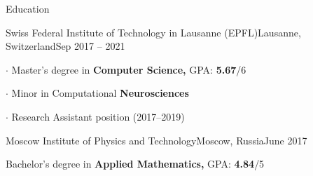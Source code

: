 \documentclass{resume} %
\begin{document}
\newcommand{\myitem}{\item[\textcolor{grayitem}{$\cdot$}]}
\begin{rSection}{Education}
\hspace{-1em}
\begin{rSubsection}{Swiss Federal Institute of Technology in Lausanne (EPFL)}{}{Lausanne, Switzerland}{Sep 2017 -- 2021}
\myitem Master's degree in {\bf Computer Science,} GPA: {\bf 5.67}/6
\myitem Minor in Computational {\bf Neurosciences}
\myitem Research Assistant position (2017--2019)
\end{rSubsection}
\begin{rSubsection}{Moscow Institute of Physics and Technology}{}{Moscow, Russia}{June 2017}
\item[] Bachelor's degree in {\bf Applied Mathematics,} GPA: {\bf 4.84}/5
\end{rSubsection}
\end{rSection}
\end{document}
